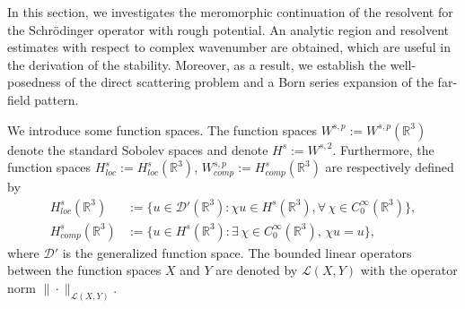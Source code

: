 \documentclass[reqno, 12pt]{amsart}
\numberwithin{equation}{section}
\begin{document}
In this section, we investigates the meromorphic continuation of the resolvent for the Schr\"odinger operator with rough potential.
An analytic region and resolvent estimates with respect to complex wavenumber are obtained, which are useful in the derivation of the stability.  Moreover, as a result, we establish the well-posedness of the direct scattering problem and a Born series expansion of the far-field pattern.  

We introduce some function spaces. The function spaces $W^{s,p}:=W^{s,p}(\mathbb{R}^3)$ denote the standard Sobolev spaces and denote $H^s:=W^{s,2}$. Furthermore, the function spaces $H^s_{loc}:=H^s_{loc}(\mathbb{R}^3)$, $W^{s,p}_{comp}:=H^s_{comp}(\mathbb{R}^3)$ are respectively defined by \begin{align*}
	H^s_{loc}(\mathbb{R}^3) &:=\{u \in \mathcal{D}'(\mathbb{R}^3):\chi u \in H^s(\mathbb{R}^3),\forall \, \chi \in C_0^\infty(\mathbb{R}^3)\}, \\ H^s_{comp}(\mathbb{R}^3) &:=\{u \in H^s(\mathbb{R}^3):\exists \, \chi \in C_0^\infty(\mathbb{R}^3),\,\chi u =u\},
\end{align*} where $\mathcal{D}'$ is the generalized function space. The bounded linear operators between the function spaces $X$ and $Y$ are denoted by $\mathcal{L}(X,Y)$ with the operator norm $\|\cdot\|_{\mathcal{L}(X,Y)}$. 
\end{document}
